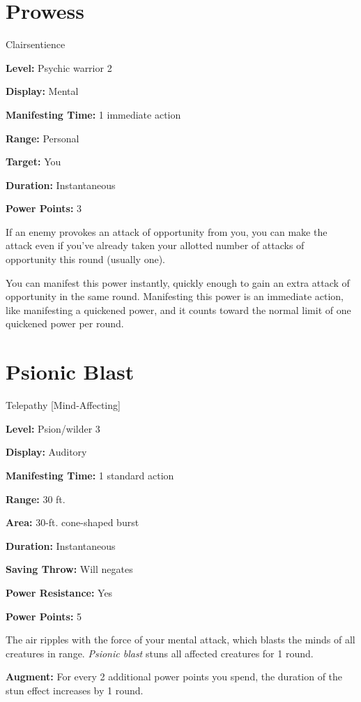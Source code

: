\documentclass{article}
\begin{document}
\section*{Prowess}

Clairsentience

\textbf{Level:} Psychic warrior 2

\textbf{Display:} Mental

\textbf{Manifesting Time:} 1 immediate action

\textbf{Range:} Personal

\textbf{Target:} You

\textbf{Duration:} Instantaneous

\textbf{Power Points:} 3

If an enemy provokes an attack of opportunity from you, you can make the attack 
even if you've already taken your allotted number of attacks of opportunity this 
round (usually one).

You can manifest this power instantly, quickly enough to gain an extra attack of 
opportunity in the same round. Manifesting this power is an immediate action, like 
manifesting a quickened power, and it counts toward the normal limit of one quickened 
power per round.

\vspace{12pt}
\section*{Psionic Blast}

Telepathy [Mind-Affecting]

\textbf{Level:} Psion/wilder 3

\textbf{Display:} Auditory

\textbf{Manifesting Time:} 1 standard action

\textbf{Range:} 30 ft.

\textbf{Area:} 30-ft. cone-shaped burst

\textbf{Duration:} Instantaneous

\textbf{Saving Throw:} Will negates

\textbf{Power Resistance:} Yes

\textbf{Power Points:} 5

The air ripples with the force of your mental attack, which blasts the minds of 
all creatures in range. \textit{Psionic blast }stuns all affected creatures for 
1 round.

\textbf{Augment:} For every 2 additional power points you spend, the duration of 
the stun effect increases by 1 round.
\end{document}
